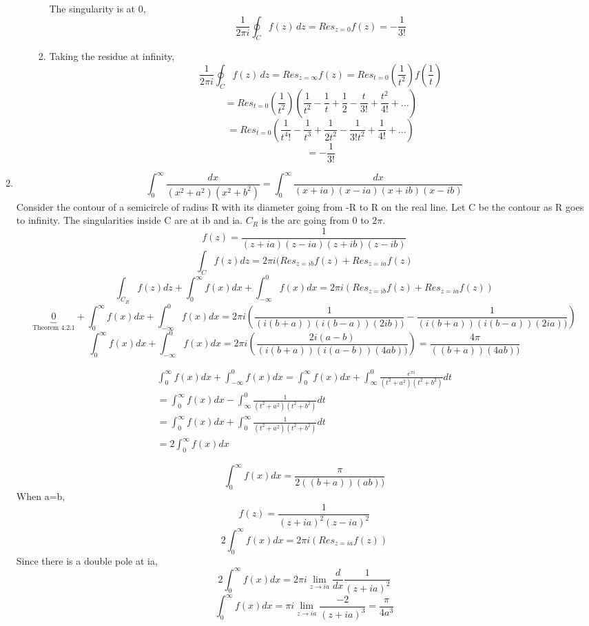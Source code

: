 \documentclass[a4paper]{article}
\begin{document}
\begin{enumerate}
\begin{enumerate}
\begin{enumerate}
	
	The singularity is at 0,
	\[\frac{1}{2\pi i}\oint_C f(z) \,dz= Res_{z=0}f(z)=-\frac{1}{3!}\]
	\item
	
	Taking the residue at infinity,
	\[\frac{1}{2\pi i}\oint_C f(z) \,dz= Res_{z=\infty}f(z)=Res_{t=0}(\frac{1}{t^2})f(\frac{1}{t}) \]
	\[ =Res_{t=0}(\frac{1}{t^2})(\frac{1}{t^2} -\frac{1}{t}+\frac{1}{2}-\frac{t}{3!}+\frac{t^2}{4!} + \ldots )\]
		\[ =Res_{t=0}(\frac{1}{t^4!} -\frac{1}{t^3}+\frac{1}{2t^2}-\frac{1}{3!t^2}+\frac{1}{4!} + \ldots )\]
		\[=-\frac{1}{3!}\]
	
\end{enumerate}  
\end{enumerate} 
\item
\[ \int_{0}^{\infty} \frac{dx}{(x^2+a^2)(x^2+b^2)}=\int_{0}^{\infty} \frac{dx}{(x+ia)(x-ia)(x+ib)(x-ib)}\] 
Consider the contour of a semicircle of radius R with its diameter going from -R to R on the real line. Let C be the contour as R goes to infinity. The singularities inside C are at ib and ia. $C_R$ is the arc going from 0 to $2\pi$.
\[f(z)=\frac{1}{(z+ia)(z-ia)(z+ib)(z-ib)}\]
\[\int_{C}f(z)dz = 2\pi i (Res_{z=ib}f(z) +Res_{z=ia}f(z)\]
\[\int_{C_R}f(z)dz +\int_{0}^{\infty}f(x)dx+\int_{-\infty}^{0} f(x) dx= 2\pi i (Res_{z=ib}f(z) +Res_{z=ia}f(z))\]
\[\underbrace{0}_\text{Theorem 4.2.1} +\int_{0}^{\infty}f(x)dx+\int_{-\infty}^{0}f(x)dx= 2\pi i (\frac{1}{(i(b+a))(i(b-a))(2ib))}-\frac{1}{(i(b+a))(i(b-a))(2ia))})\]
\[\int_{0}^{\infty}f(x)dx+\int_{-\infty}^{0}f(x)dx= 2\pi i (\frac{2i(a-b)}{(i(b+a))(i(a-b))(4ab))})= \frac{4\pi}{((b+a))(4ab))}\]
		                         	\begin{center}       
		                         		\begin{gather*}
\int_{0}^{\infty}f(x)dx+\int_{-\infty}^{0}f(x)dx=\int_{0}^{\infty}f(x)dx +\int_{\infty}^{0}\frac{e^{\pi i}}{(t^2+a^2)(t^2+b^2)}dt \\=\int_{0}^{\infty}f(x)dx -\int_{\infty}^{0}\frac{1}{(t^2+a^2)(t^2+b^2)}dt \\=\int_{0}^{\infty}f(x)dx +\int_{0}^{\infty}\frac{1}{(t^2+a^2)(t^2+b^2)}dt  \\=2 \int_{0}^{\infty}f(x)dx 
                       			\end{gather*} 
		                         		\end{center}
\[\int_{0}^{\infty}f(x)dx= \frac{\pi}{2((b+a))(ab))}\]	
When a=b,
\[f(z)=\frac{1}{(z+ia)^2(z-ia)^2}\]
\[2\int_{0}^{\infty}f(x)dx= 2\pi i (Res_{z=ia}f(z))\]
Since there is a double pole at ia,
\[2\int_{0}^{\infty}f(x)dx= 2\pi i\lim_{z\to ia} \frac{d}{dx}\frac{1}{(z+ia)^2}\]
\[\int_{0}^{\infty}f(x)dx= \pi i\lim_{z\to ia} \frac{-2}{(z+ia)^3}= \frac{\pi}{4a^3}\]


\end{enumerate}
\end{document}

